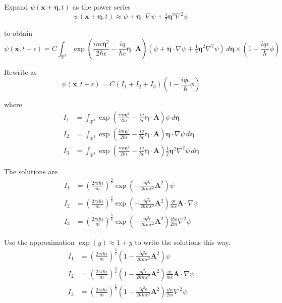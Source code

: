 Expand $\psi(\mathbf x+\boldsymbol\eta,t)$ as the power series
\begin{equation*}
\psi(\mathbf x+\boldsymbol\eta,t)\approx
\psi
+\boldsymbol\eta\cdot\nabla\psi
+\tfrac{1}{2}\boldsymbol\eta^2\nabla^2\psi
\end{equation*}

to obtain
\begin{equation*}
\psi(\mathbf x,t+\epsilon)
=C\int_{\mathbb R^3}
\exp\left(\frac{im\boldsymbol\eta^2}{2\hbar\epsilon}
-\frac{iq}{\hbar c}\boldsymbol\eta\cdot\mathbf A\right)
\left(
\psi
+\boldsymbol\eta\cdot\nabla\psi
+\tfrac{1}{2}\boldsymbol\eta^2\nabla^2\psi
\right)
\,d\boldsymbol\eta
\times\left(1-\frac{iq\epsilon}{\hbar}\phi\right)
\end{equation*}

Rewrite as
\begin{equation*}
\psi(\mathbf x,t+\epsilon)
=C(I_1+I_2+I_3)\left(1-\frac{iq\epsilon}{\hbar}\phi\right)
\tag{2}
\end{equation*}

where
\begin{align*}
I_1&=\int_{\mathbb R^3}
\exp\left(\frac{im\boldsymbol\eta^2}{2\hbar\epsilon}
-\frac{iq}{\hbar c}\boldsymbol\eta\cdot\mathbf A\right)
\psi\,d\boldsymbol\eta
\\
I_2&=\int_{\mathbb R^3}
\exp\left(\frac{im\boldsymbol\eta^2}{2\hbar\epsilon}
-\frac{iq}{\hbar c}\boldsymbol\eta\cdot\mathbf A\right)
\boldsymbol\eta\cdot\nabla\psi
\,d\boldsymbol\eta
\\
I_3&=\int_{\mathbb R^3}
\exp\left(\frac{im\boldsymbol\eta^2}{2\hbar\epsilon}
-\frac{iq}{\hbar c}\boldsymbol\eta\cdot\mathbf A\right)
\tfrac{1}{2}\boldsymbol\eta^2\nabla^2\psi
\,d\boldsymbol\eta
\end{align*}

The solutions are
\begin{align*}
I_1&=\left(\frac{2\pi i\hbar\epsilon}{m}\right)^\frac{3}{2}
\exp\left(-\frac{iq^2\epsilon}{2\hbar mc^2}\mathbf A^2\right)\psi
\\
I_2&=\left(\frac{2\pi i\hbar\epsilon}{m}\right)^\frac{3}{2}
\exp\left(-\frac{iq^2\epsilon}{2\hbar mc^2}\mathbf A^2\right)
\frac{q\epsilon}{mc}
\mathbf A\cdot\nabla\psi
\\
I_3&=\left(\frac{2\pi i\hbar\epsilon}{m}\right)^\frac{3}{2}
\exp\left(-\frac{iq^2\epsilon}{2\hbar mc^2}\mathbf A^2\right)
\frac{i\hbar\epsilon}{2m}\nabla^2\psi
\end{align*}

Use the approximation $\exp(y)\approx1+y$ to write the solutions this way.
\begin{align*}
I_1&=\left(\frac{2\pi i\hbar\epsilon}{m}\right)^\frac{3}{2}
\left(1-\frac{iq^2\epsilon}{2\hbar mc^2}\mathbf A^2\right)\psi
\\
I_2&=\left(\frac{2\pi i\hbar\epsilon}{m}\right)^\frac{3}{2}
\left(1-\frac{iq^2\epsilon}{2\hbar mc^2}\mathbf A^2\right)
\frac{q\epsilon}{mc}
\mathbf A\cdot\nabla\psi
\\
I_3&=\left(\frac{2\pi i\hbar\epsilon}{m}\right)^\frac{3}{2}
\left(1-\frac{iq^2\epsilon}{2\hbar mc^2}\mathbf A^2\right)
\frac{i\hbar\epsilon}{2m}\nabla^2\psi
\end{align*}

